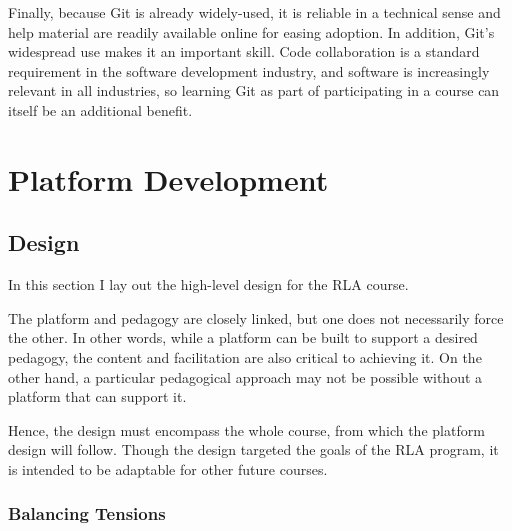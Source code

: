 \documentclass[12pt,twoside]{mitthesis}
\begin{document}
{Finally, because Git is already widely-used, it is reliable in a technical sense and help material are readily available online for easing adoption. In addition, Git's widespread use makes it an important skill. Code collaboration is a standard requirement in the software development industry, and software is increasingly relevant in all industries, so learning Git as part of participating in a course can itself be an additional benefit.~\cite{haaranen2015teaching}}

\chapter{Platform Development}

\section{Design}

In this section I lay out the high-level design for the RLA course. 

The platform and pedagogy are closely linked, but one does not necessarily force the other. In other words, while a platform can be built to support a desired pedagogy, the content and facilitation are also critical to achieving it. On the other hand, a particular pedagogical approach may not be possible without a platform that can support it. 

Hence, the design must encompass the whole course, from which the platform design will follow. Though the design targeted the goals of the RLA program, it is intended to be adaptable for other future courses.

\subsection{Balancing Tensions}
\end{document}
